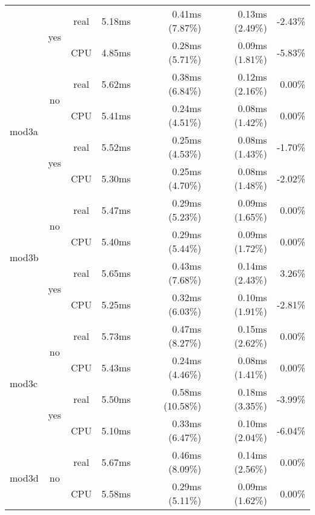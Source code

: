 \documentclass[en]{pracamgr}
\begin{document}
\begin{appendices}
\begin{small}
\begin{longtable}{|l|c|c|r|r|r|r|}
                          \cline{2-7}
                          & \multirow{2}{*}{yes} & real & 5.18ms & 0.41ms (7.87\%) & 0.13ms (2.49\%) & -2.43\% \\*
                          &                      & CPU  & 4.85ms & 0.28ms (5.71\%) & 0.09ms (1.81\%) & -5.83\% \\
\hline
\multirow{4}{*}{mod3a}    & \multirow{2}{*}{no}  & real & 5.62ms & 0.38ms (6.84\%) & 0.12ms (2.16\%) & 0.00\% \\*
                          &                      & CPU  & 5.41ms & 0.24ms (4.51\%) & 0.08ms (1.42\%) & 0.00\% \\*
                          \cline{2-7}
                          & \multirow{2}{*}{yes} & real & 5.52ms & 0.25ms (4.53\%) & 0.08ms (1.43\%) & -1.70\% \\*
                          &                      & CPU  & 5.30ms & 0.25ms (4.70\%) & 0.08ms (1.48\%) & -2.02\% \\
\hline
\multirow{4}{*}{mod3b}    & \multirow{2}{*}{no}  & real & 5.47ms & 0.29ms (5.23\%) & 0.09ms (1.65\%) & 0.00\% \\*
                          &                      & CPU  & 5.40ms & 0.29ms (5.44\%) & 0.09ms (1.72\%) & 0.00\% \\*
                          \cline{2-7}
                          & \multirow{2}{*}{yes} & real & 5.65ms & 0.43ms (7.68\%) & 0.14ms (2.43\%) & 3.26\% \\*
                          &                      & CPU  & 5.25ms & 0.32ms (6.03\%) & 0.10ms (1.91\%) & -2.81\% \\
\hline
\multirow{4}{*}{mod3c}    & \multirow{2}{*}{no}  & real & 5.73ms & 0.47ms (8.27\%) & 0.15ms (2.62\%) & 0.00\% \\*
                          &                      & CPU  & 5.43ms & 0.24ms (4.46\%) & 0.08ms (1.41\%) & 0.00\% \\*
                          \cline{2-7}
                          & \multirow{2}{*}{yes} & real & 5.50ms & 0.58ms (10.58\%) & 0.18ms (3.35\%) & -3.99\% \\*
                          &                      & CPU  & 5.10ms & 0.33ms (6.47\%) & 0.10ms (2.04\%) & -6.04\% \\
\hline
\multirow{4}{*}{mod3d}    & \multirow{2}{*}{no}  & real & 5.67ms & 0.46ms (8.09\%) & 0.14ms (2.56\%) & 0.00\% \\*
                          &                      & CPU  & 5.58ms & 0.29ms (5.11\%) & 0.09ms (1.62\%) & 0.00\% \\*

\end{longtable}
\end{small}
\end{appendices}
\end{document}
